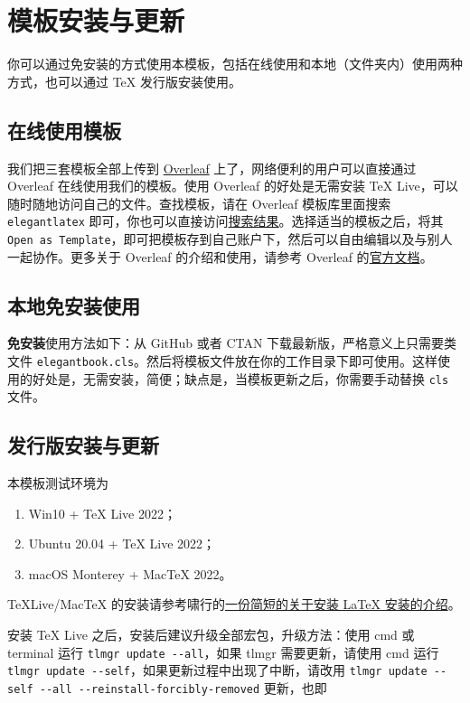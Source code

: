 \documentclass[lang=cn,newtx,10pt,scheme=chinese]{elegantbook}
\begin{document}
\section{模板安装与更新}

你可以通过免安装的方式使用本模板，包括在线使用和本地（文件夹内）使用两种方式，也可以通过 \TeX{} 发行版安装使用。

\subsection{在线使用模板}

我们把三套模板全部上传到 \href{https://www.overleaf.com/}{Overleaf} 上了，网络便利的用户可以直接通过 Overleaf 在线使用我们的模板。使用 Overleaf 的好处是无需安装 \TeX{} Live，可以随时随地访问自己的文件。查找模板，请在 Overleaf 模板库里面搜索 \lstinline{elegantlatex} 即可，你也可以直接访问\href{https://www.overleaf.com/latex/templates?addsearch=elegantlatex}{搜索结果}。选择适当的模板之后，将其 \lstinline{Open as Template}，即可把模板存到自己账户下，然后可以自由编辑以及与别人一起协作。更多关于 Overleaf 的介绍和使用，请参考 Overleaf 的\href{https://www.overleaf.com/learn}{官方文档}。

\subsection{本地免安装使用}

\textbf{免安装}使用方法如下：从 GitHub 或者 CTAN 下载最新版，严格意义上只需要类文件 \lstinline{elegantbook.cls}。然后将模板文件放在你的工作目录下即可使用。这样使用的好处是，无需安装，简便；缺点是，当模板更新之后，你需要手动替换 \lstinline{cls} 文件。

\subsection{发行版安装与更新}

本模板测试环境为 
\begin{enumerate}
  \item Win10 + \TeX{} Live 2022；
  \item Ubuntu 20.04 + \TeX{} Live 2022；
  \item macOS Monterey + Mac\TeX{} 2022。
\end{enumerate}

\TeX Live/Mac\TeX{} 的安装请参考啸行的\href{https://github.com/OsbertWang/install-latex-guide-zh-cn/releases/}{一份简短的关于安装 \LaTeX{} 安装的介绍}。

安装 \TeX{} Live 之后，安装后建议升级全部宏包，升级方法：使用 cmd 或 terminal 运行 \lstinline{tlmgr update --all}，如果 tlmgr 需要更新，请使用 cmd 运行 \lstinline{tlmgr update --self}，如果更新过程中出现了中断，请改用 \lstinline{tlmgr update --self --all --reinstall-forcibly-removed} 更新，也即
\end{document}

